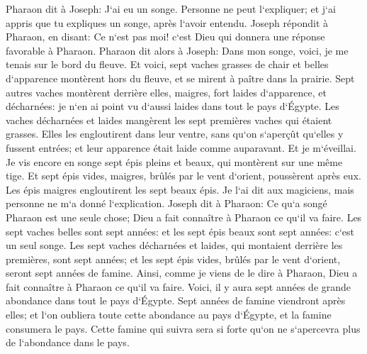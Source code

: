 \verse Pharaon dit à Joseph: J`ai eu un songe. Personne ne peut l`expliquer; et j`ai appris que tu expliques un songe, après l`avoir entendu. 
\verse Joseph répondit à Pharaon, en disant: Ce n`est pas moi! c`est Dieu qui donnera une réponse favorable à Pharaon. 
\verse Pharaon dit alors à Joseph: Dans mon songe, voici, je me tenais sur le bord du fleuve. 
\verse Et voici, sept vaches grasses de chair et belles d`apparence montèrent hors du fleuve, et se mirent à paître dans la prairie. 
\verse Sept autres vaches montèrent derrière elles, maigres, fort laides d`apparence, et décharnées: je n`en ai point vu d`aussi laides dans tout le pays d`Égypte. 
\verse Les vaches décharnées et laides mangèrent les sept premières vaches qui étaient grasses. 
\verse Elles les engloutirent dans leur ventre, sans qu`on s`aperçût qu`elles y fussent entrées; et leur apparence était laide comme auparavant. Et je m`éveillai. 
\verse Je vis encore en songe sept épis pleins et beaux, qui montèrent sur une même tige. 
\verse Et sept épis vides, maigres, brûlés par le vent d`orient, poussèrent après eux. 
\verse Les épis maigres engloutirent les sept beaux épis. Je l`ai dit aux magiciens, mais personne ne m`a donné l`explication. 
\verse Joseph dit à Pharaon: Ce qu`a songé Pharaon est une seule chose; Dieu a fait connaître à Pharaon ce qu`il va faire. 
\verse Les sept vaches belles sont sept années: et les sept épis beaux sont sept années: c`est un seul songe. 
\verse Les sept vaches décharnées et laides, qui montaient derrière les premières, sont sept années; et les sept épis vides, brûlés par le vent d`orient, seront sept années de famine. 
\verse Ainsi, comme je viens de le dire à Pharaon, Dieu a fait connaître à Pharaon ce qu`il va faire. 
\verse Voici, il y aura sept années de grande abondance dans tout le pays d`Égypte. 
\verse Sept années de famine viendront après elles; et l`on oubliera toute cette abondance au pays d`Égypte, et la famine consumera le pays. 
\verse Cette famine qui suivra sera si forte qu`on ne s`apercevra plus de l`abondance dans le pays. 
